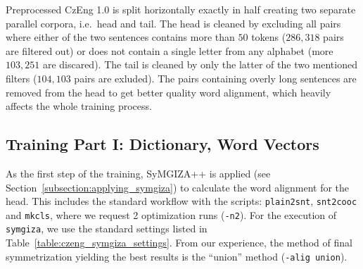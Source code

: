 Preprocessed CzEng 1.0 is split horizontally exactly in half creating two separate parallel corpora, i.e.\ head and tail. The head is cleaned by excluding all pairs where either of the two sentences contains more than $50$ tokens ($286,318$ pairs are filtered out) or does not contain a single letter from any alphabet (more $103,251$ are discared). The tail is cleaned by only the latter of the two mentioned filters ($104,103$ pairs are exluded). The pairs containing overly long sentences are removed from the head to get better quality word alignment, which heavily affects the whole training process.

\subsection{Training Part I: Dictionary, Word Vectors}
\label{subsection:czeng_experiment_training_1}

As the first step of the training, SyMGIZA++ is applied (see Section~\ref{subsection:applying_symgiza}) to calculate the word alignment for the head. This includes the standard workflow with the scripts: \texttt{plain2snt}, \texttt{snt2cooc} and \texttt{mkcls}, where we request 2 optimization runs (\texttt{-n2}). For the execution of \texttt{symgiza}, we use the standard settings listed in Table~\ref{table:czeng_symgiza_settings}. From our experience, the method of final symmetrization yielding the best results is the ``union'' method (\texttt{-alig union}).
	
